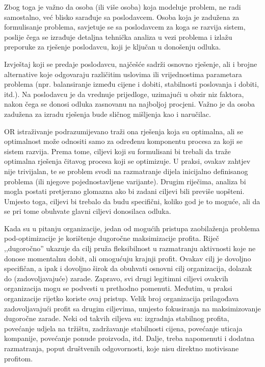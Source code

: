 \documentclass[a4paper, utf8, 11pt, colorlinks]{book}
\theoremstyle{definition}
\begin{document}
Zbog toga je važno da osoba (ili više osoba) koja modeluje problem,  ne radi samostalno, već blisko sarađuje sa poslodavcem. Osoba koja je zadužena za formulisanje problema, savjetuje se sa poslodavcem za koga se razvija sistem, poslije čega se izrađuje detaljna tehnička analiza u vezi problema i izlažu preporuke za rješenje  poslodavcu, koji je ključan u donošenju odluka.   


Izvještaj koji se predaje poslodavcu, najčešće sadrži osnovno rješenje, ali i brojne alternative koje odgovaraju različitim uslovima ili  vrijednostima parametara problema  (npr. balansiranje između cijene i dobiti, stabilnosti poslovanja i dobiti, itd.). Na poslodavcu je da vrednuje prijedloge, uzimajući u obzir  niz faktora, nakon čega se donosi odluka zasnovanu na najboljoj procjeni. Važno je da osoba zadužena za izradu rješenja bude sličnog mišljenja kao i naručilac. %


OR istraživanje podrazumijevano traži ona rješenja koja su optimalna, ali se optimalnost može odnositi samo za određenu komponentu procesa za koji se sistem razvija. Prema tome, ciljevi koji su formulisani bi trebali da traže optimalna rješenja čitavog procesa koji se optimizuje.  U praksi, ovakav zahtjev nije trivijalan, te se problem svodi na razmatranje dijela inicijalno definisanog problema (ili njegove pojednostavljene varijante). Drugim riječima, analiza bi mogla postati pretjerano glomazna ako bi zadani ciljevi bili previše uopšteni. Umjesto toga, ciljevi bi trebalo da budu specifični, koliko god je to moguće, ali da se pri tome obuhvate glavni ciljevi donosilaca odluka. 


Kada su u pitanju  organizacije, jedan od mogućih pristupa zaobilaženja problema pod-optimizacije je korištenje dugoročne maksimizacije profita. Riječ ,,dugoročno'' ukazuje da cilj pruža fleksibilnost u razmatranju aktivnosti koje ne donose momentalnu dobit, ali omogućuju krajnji profit. Ovakav cilj je dovoljno specifičan, a ipak i dovoljno širok da obuhvati osnovni cilj   organizacija, dolazak do (zadovoljavajuće) zarade. Zapravo, svi drugi legitimni ciljevi ovakvih organizacija mogu se podvesti u prethodno pomenuti. Međutim, u praksi   organizacije rijetko koriste ovaj pristup. Velik broj   organizacija prilagođava zadovoljavajući profit sa drugim ciljevima, umjesto fokusiranja na maksimizovanje dugoročne zarade. Neki od takvih ciljeva su: izgradnja stabilnog profita, povećanje udjela na tržištu, zadržavanje stabilnosti cijena, povećanje uticaja kompanije, povećanje ponude proizvoda, itd. 
Dalje, treba napomenuti i dodatna razmatranja, poput društvenih odgovornosti, koje nisu direktno motivisane profitom.  
\end{document}
